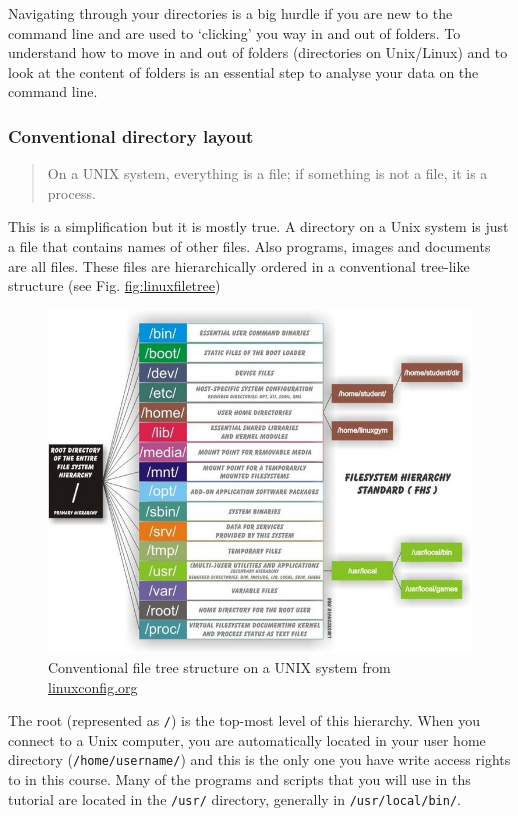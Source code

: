 \documentclass[11pt]{article}
\begin{document}
Navigating through your directories is a big hurdle if you are new to
the command line and are used to `clicking' you way in and out of folders. To
understand how to move in and out of folders (directories on Unix/Linux) and to look at the
content of folders is an essential step to analyse your data on
the command line.
\subsubsection{Conventional directory layout}
\label{sec-2-1-1}



\begin{quote}
On a UNIX system, everything is a file; if something is not a file, it is a process.
\end{quote}

This is a simplification but it is mostly true. A directory on a Unix
system is just a file that contains names of other files. Also
programs, images and documents are all files. These files are
hierarchically ordered in a conventional tree-like structure (see
Fig. \hyperref[fig-linuxfiletree]{fig:linuxfiletree})


\begin{figure}[htb]
\centering
\includegraphics[width= 12cm ]{linuxfiletree.jpg}
\caption{Conventional file tree structure on a UNIX system from \href{http://linuxconfig.org/filesystem-basics}{linuxconfig.org}}
\end{figure}


The root (represented as \texttt{/}) is the top-most level of this hierarchy.
When you connect to a Unix computer, you are automatically located in
your user home directory (\texttt{/home/username/}) and this is the only one
you have write access rights to in this course. Many of the programs and
scripts that you will use in ths tutorial are located in the \texttt{/usr/}
directory, generally in \texttt{/usr/local/bin/}. 
\end{document}
